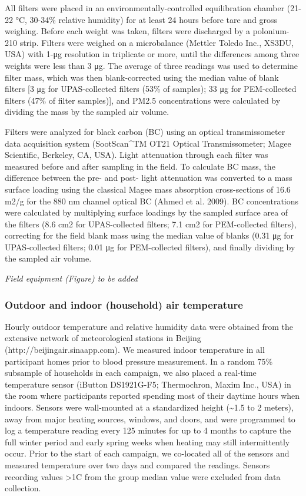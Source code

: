 \documentclass[
  letterpaper,
  DIV=11,
  numbers=noendperiod]{scrartcl}
\begin{document}
All filters were placed in an environmentally-controlled equilibration
chamber (21-22 °C, 30-34\% relative humidity) for at least 24 hours
before tare and gross weighing. Before each weight was taken, filters
were discharged by a polonium-210 strip. Filters were weighed on a
microbalance (Mettler Toledo Inc., XS3DU, USA) with 1-μg resolution in
triplicate or more, until the differences among three weights were less
than 3 μg. The average of three readings was used to determine filter
mass, which was then blank-corrected using the median value of blank
filters {[}3 μg for UPAS-collected filters (53\% of samples); 33 μg for
PEM-collected filters (47\% of filter samples){]}, and PM2.5
concentrations were calculated by dividing the mass by the sampled air
volume.

Filters were analyzed for black carbon (BC) using an optical
transmissometer data acquisition system (SootScan\^{}TM OT21 Optical
Transmissometer; Magee Scientific, Berkeley, CA, USA). Light attenuation
through each filter was measured before and after sampling in the field.
To calculate BC mass, the difference between the pre- and post- light
attenuation was converted to a mass surface loading using the classical
Magee mass absorption cross-sections of 16.6 m2/g for the 880 nm channel
optical BC (Ahmed et al. 2009). BC concentrations were calculated by
multiplying surface loadings by the sampled surface area of the filters
(8.6 cm2 for UPAS-collected filters; 7.1 cm2 for PEM-collected filters),
correcting for the field blank mass using the median value of blanks
(0.31 μg for UPAS-collected filters; 0.01 μg for PEM-collected filters),
and finally dividing by the sampled air volume.

\emph{Field equipment (Figure) to be added}

\hypertarget{outdoor-and-indoor-household-air-temperature}{%
\subsubsection{Outdoor and indoor (household) air
temperature}\label{outdoor-and-indoor-household-air-temperature}}

Hourly outdoor temperature and relative humidity data were obtained from
the extensive network of meteorological stations in Beijing
(http://beijingair.sinaapp.com). We measured indoor temperature in all
participant homes prior to blood pressure measurement. In a random 75\%
subsample of households in each campaign, we also placed a real-time
temperature sensor (iButton DS1921G-F5; Thermochron, Maxim Inc., USA) in
the room where participants reported spending most of their daytime
hours when indoors. Sensors were wall-mounted at a standardized height
(\textasciitilde1.5 to 2 meters), away from major heating sources,
windows, and doors, and were programmed to log a temperature reading
every 125 minutes for up to 4 months to capture the full winter period
and early spring weeks when heating may still intermittently occur.
Prior to the start of each campaign, we co-located all of the sensors
and measured temperature over two days and compared the readings.
Sensors recording values \textgreater1C from the group median value were
excluded from data collection.
\end{document}
